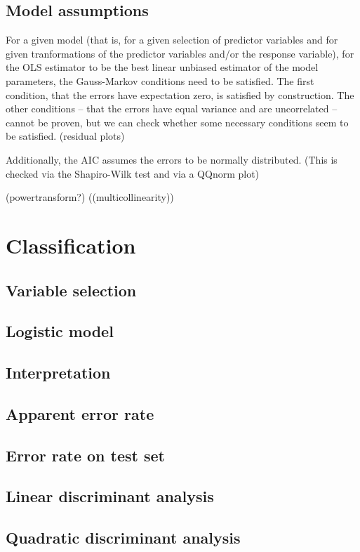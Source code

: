 \documentclass[a4paper, 12pt]{article}
\begin{document}
\subsection*{Model assumptions}

For a given model (that is, for a given selection of predictor variables and for given tranformations of the predictor variables and/or the response variable), for the OLS estimator to be the best linear unbiased estimator of the model parameters, the Gauss-Markov conditions need to be satisfied. The first condition, that the errors have expectation zero, is satisfied by construction. The other conditions -- that the errors have equal variance and are uncorrelated -- cannot be proven, but we can check whether some necessary conditions seem to be satisfied.
(residual plots)

Additionally, the AIC assumes the errors to be normally distributed. (This is checked via the Shapiro-Wilk test and via a QQnorm plot)

(powertransform?)
((multicollinearity))


\section{Classification}
\subsection*{Variable selection}
\subsection*{Logistic model}
\subsection*{Interpretation}
\subsection*{Apparent error rate}
\subsection*{Error rate on test set}
\subsection*{Linear discriminant analysis}
\subsection*{Quadratic discriminant analysis}
\end{document}
